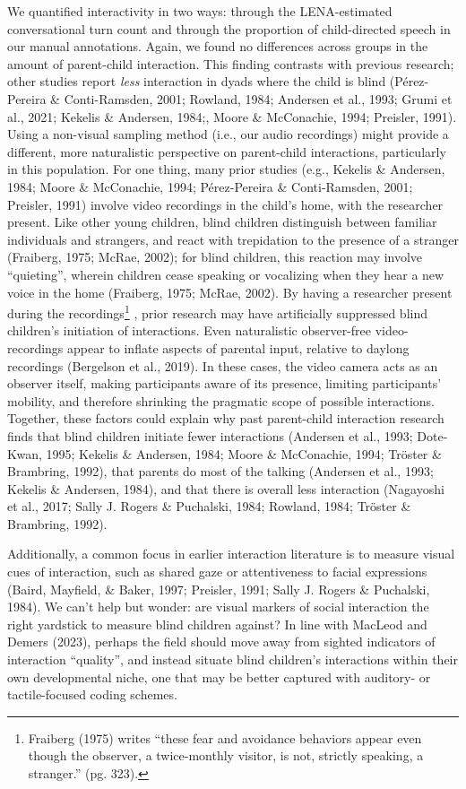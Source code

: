 \documentclass[
  man,floatsintext]{apa6}
\begin{document}
We quantified interactivity in two ways: through the LENA-estimated conversational turn count and through the proportion of child-directed speech in our manual annotations. Again, we found no differences across groups in the amount of parent-child interaction. This finding contrasts with previous research; other studies report \emph{less} interaction in dyads where the child is blind (Pérez-Pereira \& Conti-Ramsden, 2001; Rowland, 1984; Andersen et al., 1993; Grumi et al., 2021; Kekelis \& Andersen, 1984;, Moore \& McConachie, 1994; Preisler, 1991). Using a non-visual sampling method (i.e., our audio recordings) might provide a different, more naturalistic perspective on parent-child interactions, particularly in this population. For one thing, many prior studies (e.g., Kekelis \& Andersen, 1984; Moore \& McConachie, 1994; Pérez-Pereira \& Conti-Ramsden, 2001; Preisler, 1991) involve video recordings in the child's home, with the researcher present. Like other young children, blind children distinguish between familiar individuals and strangers, and react with trepidation to the presence of a stranger (Fraiberg, 1975; McRae, 2002); for blind children, this reaction may involve ``quieting'', wherein children cease speaking or vocalizing when they hear a new voice in the home (Fraiberg, 1975; McRae, 2002). By having a researcher present during the recordings\footnote{Fraiberg (1975) writes ``these fear and avoidance behaviors appear even though the observer, a twice-monthly visitor, is not, strictly speaking, a stranger.'' (pg. 323).} , prior research may have artificially suppressed blind children's initiation of interactions. Even naturalistic observer-free video-recordings appear to inflate aspects of parental input, relative to daylong recordings (Bergelson et al., 2019). In these cases, the video camera acts as an observer itself, making participants aware of its presence, limiting participants' mobility, and therefore shrinking the pragmatic scope of possible interactions. Together, these factors could explain why past parent-child interaction research finds that blind children initiate fewer interactions (Andersen et al., 1993; Dote-Kwan, 1995; Kekelis \& Andersen, 1984; Moore \& McConachie, 1994; Tröster \& Brambring, 1992), that parents do most of the talking (Andersen et al., 1993; Kekelis \& Andersen, 1984), and that there is overall less interaction (Nagayoshi et al., 2017; Sally J. Rogers \& Puchalski, 1984; Rowland, 1984; Tröster \& Brambring, 1992).

Additionally, a common focus in earlier interaction literature is to measure visual cues of interaction, such as shared gaze or attentiveness to facial expressions (Baird, Mayfield, \& Baker, 1997; Preisler, 1991; Sally J. Rogers \& Puchalski, 1984). We can't help but wonder: are visual markers of social interaction the right yardstick to measure blind children against? In line with MacLeod and Demers (2023), perhaps the field should move away from sighted indicators of interaction ``quality'', and instead situate blind children's interactions within their own developmental niche, one that may be better captured with auditory- or tactile-focused coding schemes.
\end{document}
